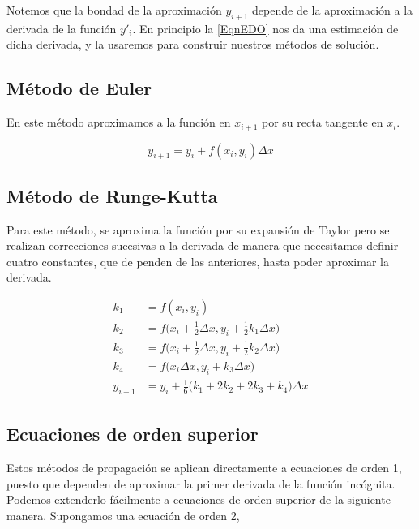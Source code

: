 Notemos que la bondad de la aproximación $y_{i+1}$ depende de la aproximación a la derivada de la 
función $y'_i$. En principio la \autoref{EqnEDO} nos da una estimación de dicha derivada, y la 
usaremos para construir nuestros métodos de solución. 

\subsection{Método de Euler}

En este método aproximamos a la función en $x_{i+1}$ por su recta tangente en $x_{i}$. 


\begin{equation}
  y_{i+1} = y_i + f(x_i, y_i ) \Delta x
\end{equation}

\subsection{Método de Runge-Kutta}

Para este método, se aproxima la función por su expansión de Taylor pero se
realizan correcciones sucesivas a la derivada de manera que necesitamos definir
cuatro constantes, que de penden de las anteriores, hasta poder aproximar la
derivada. 

\begin{equation}
  \begin{aligned}
    k_1 &= f(x_i, y_i)\\
    k_2 &= f \Big( x_i + \frac{1}{2} \Delta x, y_i + \frac{1}{2} k_1 \Delta x \Big)\\
    k_3 &= f \Big( x_i + \frac{1}{2} \Delta x, y_i + \frac{1}{2} k_2 \Delta x \Big)\\
    k_4 &= f \Big( x_i \Delta x, y_i + k_3 \Delta x \Big)\\
    y_{i+1} &= y_i+\frac{1}{6} \Big( k_1 + 2 k_2 + 2 k_3 + k_4 \Big) \Delta x
  \end{aligned}
\end{equation}

\subsection{Ecuaciones de orden superior}

Estos métodos de propagación se aplican directamente a ecuaciones de orden 1,
puesto que dependen de aproximar la primer derivada de la función incógnita. 
Podemos extenderlo fácilmente a ecuaciones de orden superior de la siguiente manera.
Supongamos una ecuación de orden 2, 

